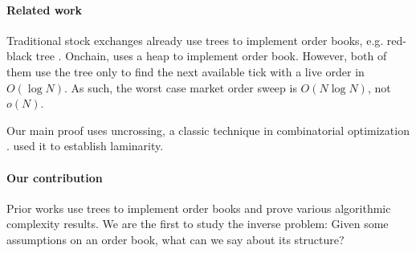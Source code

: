\paragraph{Related work}
Traditional stock exchanges already use trees to implement order books, e.g. red-black tree  \parencite{selph}. Onchain, \textcite{lobster} uses a heap to implement order book. However, both of them use the tree only to find the next available tick with a live order in $O(\log N)$. As such, the worst case market order sweep is $O(N\log N)$, not $o(N)$.

Our main proof uses uncrossing, a classic technique in combinatorial optimization \parencite{lovasz}. \textcite{edmonds} used it to establish laminarity.

\paragraph{Our contribution}
Prior works use trees to implement order books and prove various algorithmic complexity results. We are the first to study the inverse problem: Given some assumptions on an order book, what can we say about its structure?